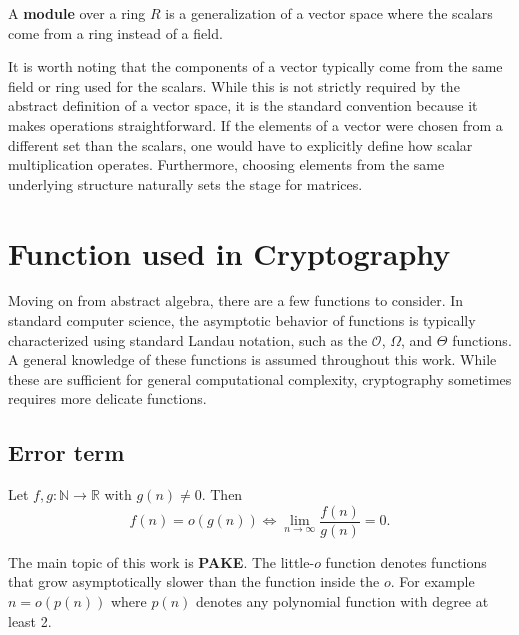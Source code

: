 \begin{definition}[Module]
A \textbf{module} over a ring $R$ is a generalization of a vector space where the scalars come from a ring instead of a field.
\end{definition}

It is worth noting that the components of a vector typically come from the same field or ring used for the scalars. While this is not strictly required by the abstract definition of a vector space, it is the standard convention because it makes operations straightforward. If the elements of a vector were chosen from a different set than the scalars, one would have to explicitly define how scalar multiplication operates. Furthermore, choosing elements from the same underlying structure naturally sets the stage for matrices.


\section{Function used in Cryptography}

Moving on from abstract algebra, there are a few functions to consider. In standard computer science, the asymptotic behavior of functions is typically characterized using standard Landau notation, such as the $\mathcal{O}$, $\Omega$, and $\Theta$ functions. A general knowledge of these functions is assumed throughout this work. While these are sufficient for general computational complexity, cryptography sometimes requires more delicate functions.



\subsection{Error term}

\begin{definition}
Let $f,g : \mathbb{N} \to \mathbb{R}$ with $g(n) \neq 0$. Then
\[
f(n) = o(g(n))
\iff
\lim_{n \to \infty} \frac{f(n)}{g(n)} = 0.
\]
\end{definition}
The main topic of this work is \textbf{PAKE}. 
The little-$o$ function denotes functions that grow asymptotically slower than the function inside the $o$. For example $n = o(p(n))$ where $p(n)$ denotes any polynomial function with degree at least 2.


